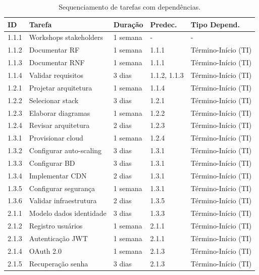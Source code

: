 \begin{table}[H]
\centering
\caption{Sequenciamento de tarefas com dependências.}%
\label{tab:sequenciamento}
\footnotesize
\begin{tabular}{|p{1cm}|p{5cm}|p{2cm}|p{1.5cm}|p{3cm}|}
\hline
\textbf{ID} & \textbf{Tarefa} & \textbf{Duração} & \textbf{Predec.} & \textbf{Tipo Depend.} \\ \hline
1.1.1 & Workshops stakeholders & 1 semana & - & - \\ \hline
1.1.2 & Documentar RF & 1 semana & 1.1.1 & Término-Início (TI) \\ \hline
1.1.3 & Documentar RNF & 1 semana & 1.1.1 & Término-Início (TI) \\ \hline
1.1.4 & Validar requisitos & 3 dias & 1.1.2, 1.1.3 & Término-Início (TI) \\ \hline
1.2.1 & Projetar arquitetura & 1 semana & 1.1.4 & Término-Início (TI) \\ \hline
1.2.2 & Selecionar stack & 3 dias & 1.2.1 & Término-Início (TI) \\ \hline
1.2.3 & Elaborar diagramas & 1 semana & 1.2.2 & Término-Início (TI) \\ \hline
1.2.4 & Revisar arquitetura & 2 dias & 1.2.3 & Término-Início (TI) \\ \hline
1.3.1 & Provisionar cloud & 1 semana & 1.2.4 & Término-Início (TI) \\ \hline
1.3.2 & Configurar auto-scaling & 3 dias & 1.3.1 & Término-Início (TI) \\ \hline
1.3.3 & Configurar BD & 3 dias & 1.3.1 & Término-Início (TI) \\ \hline
1.3.4 & Implementar CDN & 2 dias & 1.3.1 & Término-Início (TI) \\ \hline
1.3.5 & Configurar segurança & 1 semana & 1.3.1 & Término-Início (TI) \\ \hline
1.3.6 & Validar infraestrutura & 2 dias & 1.3.5 & Término-Início (TI) \\ \hline
2.1.1 & Modelo dados identidade & 3 dias & 1.3.3 & Término-Início (TI) \\ \hline
2.1.2 & Registro usuários & 1 semana & 2.1.1 & Término-Início (TI) \\ \hline
2.1.3 & Autenticação JWT & 1 semana & 2.1.1 & Término-Início (TI) \\ \hline
2.1.4 & OAuth 2.0 & 1 semana & 2.1.3 & Término-Início (TI) \\ \hline
2.1.5 & Recuperação senha & 3 dias & 2.1.3 & Término-Início (TI) \\ \hline

\end{tabular}
\end{table}
